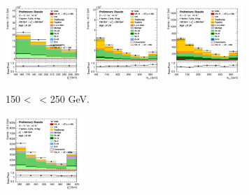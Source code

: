 \begin{figure}[h!]
    \begin{subfigure}[b]{\textwidth}
        \centering
        \includegraphics[width=0.32\textwidth]{Images/VH/Own_fit/prefit_VHcc/Region_distpTV_BMax250_BMin150_DCRHigh_J3_TTypent_T1_L1_Y6051_Prefit.png}
        \includegraphics[width=0.32\textwidth]{Images/VH/Own_fit/prefit_VHcc/Region_distmBB_BMax250_BMin150_DCRHigh_J3_TTypelt_T2_L1_Y6051_Prefit.png}
        \includegraphics[width=0.32\textwidth]{Images/VH/Own_fit/prefit_VHcc/Region_distmBB_BMax250_BMin150_DCRHigh_J3_TTypett_T2_L1_Y6051_Prefit.png}
        \caption{150 < \ptv\ < 250 GeV.}
        \label{fig:plots_VHcc_1L_150_CRH_3J}
    \end{subfigure}
    \begin{subfigure}[b]{\textwidth}
        \centering
        \includegraphics[width=0.32\textwidth]{Images/VH/Own_fit/prefit_VHcc/Region_distpTV_BMin250_DCRHigh_J3_TTypent_T1_L1_Y6051_Prefit.png}

\end{subfigure}
\end{figure}
